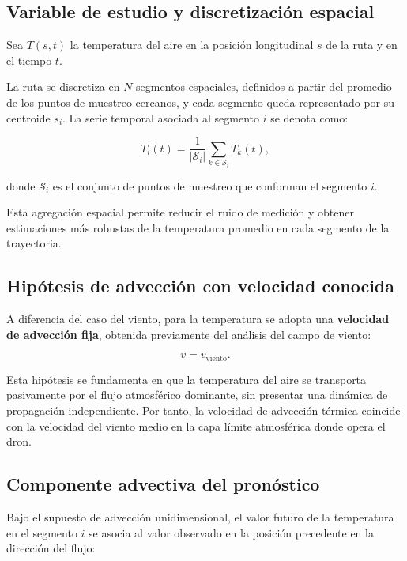 \documentclass[
  spanish,
  us-letterpaper,
]{scrreprt}
\numberwithin{equation}{section}
\begin{document}
\subsection{Variable de estudio y discretización
espacial}\label{variable-de-estudio-y-discretizaciuxf3n-espacial}

Sea \(T(s,t)\) la temperatura del aire en la posición longitudinal \(s\)
de la ruta y en el tiempo \(t\).

La ruta se discretiza en \(N\) segmentos espaciales, definidos a partir
del promedio de los puntos de muestreo cercanos, y cada segmento queda
representado por su centroide \(s_i\). La serie temporal asociada al
segmento \(i\) se denota como:

\[
T_i(t) = \frac{1}{|\mathcal{S}_i|} \sum_{k \in \mathcal{S}_i} T_k(t),
\]

donde \(\mathcal{S}_i\) es el conjunto de puntos de muestreo que
conforman el segmento \(i\).

Esta agregación espacial permite reducir el ruido de medición y obtener
estimaciones más robustas de la temperatura promedio en cada segmento de
la trayectoria.

\subsection{Hipótesis de advección con velocidad
conocida}\label{hipuxf3tesis-de-advecciuxf3n-con-velocidad-conocida}

A diferencia del caso del viento, para la temperatura se adopta una
\textbf{velocidad de advección fija}, obtenida previamente del análisis
del campo de viento:

\[
v = v_{\text{viento}}.
\]

Esta hipótesis se fundamenta en que la temperatura del aire se
transporta pasivamente por el flujo atmosférico dominante, sin presentar
una dinámica de propagación independiente. Por tanto, la velocidad de
advección térmica coincide con la velocidad del viento medio en la capa
límite atmosférica donde opera el dron.

\subsection{Componente advectiva del
pronóstico}\label{componente-advectiva-del-pronuxf3stico}

Bajo el supuesto de advección unidimensional, el valor futuro de la
temperatura en el segmento \(i\) se asocia al valor observado en la
posición precedente en la dirección del flujo:
\end{document}
